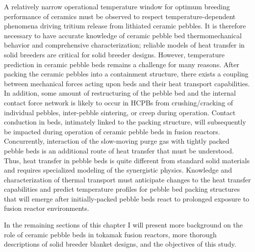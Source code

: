 A relatively narrow operational temperature window for optimum breeding performance of ceramics must be observed to respect temperature-dependent phenomena driving tritium release from lithiated ceramic pebbles. It is therefore necessary to have accurate knowledge of ceramic pebble bed thermomechanical behavior and comprehensive characterization; reliable models of heat transfer in solid breeders are critical for solid breeder designs. However, temperature prediction in ceramic pebble beds remains a challenge for many reasons. After packing the ceramic pebbles into a containment structure, there exists a coupling between mechanical forces acting upon beds and their heat transport capabilities. In addition, some amount of restructuring of the pebble bed and the internal contact force network is likely to occur in HCPBs from crushing/cracking of individual pebbles, inter-pebble sintering, or creep during operation. Contact conduction in beds, intimately linked to the packing structure, will subsequently be impacted during operation of ceramic pebble beds in fusion reactors. Concurrently, interaction of the slow-moving purge gas with tightly packed pebble beds is an additional route of heat transfer that must be understood. Thus, heat transfer in pebble beds is quite different from standard solid materials and requires specialized modeling of the synergistic physics. Knowledge and characterization of thermal transport must anticipate changes to the heat transfer capabilities and predict temperature profiles for pebble bed packing structures that will emerge after initially-packed pebble beds react to prolonged exposure to fusion reactor environments.

In the remaining sections of this chapter I will present more background on the role of ceramic pebble beds in tokamak fusion reactors, more thorough descriptions of solid breeder blanket designs, and the objectives of this study.


















